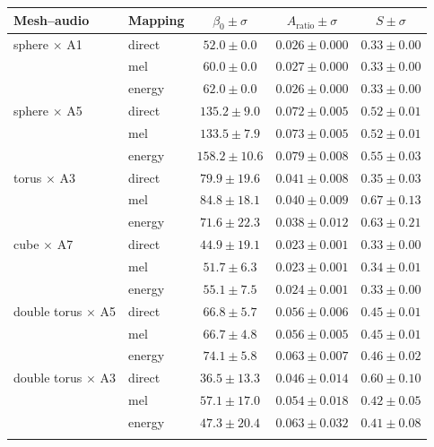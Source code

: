 \begin{tabular}{llccc}
\toprule
Mesh--audio & Mapping & $\beta_0 \pm \sigma$ & $A_{\mathrm{ratio}} \pm \sigma$ & $S \pm \sigma$ \\
\midrule
sphere $\times$ A1 & direct & $52.0 \pm 0.0$ & $0.026 \pm 0.000$ & $0.33 \pm 0.00$ \\
 & mel & $60.0 \pm 0.0$ & $0.027 \pm 0.000$ & $0.33 \pm 0.00$ \\
 & energy & $62.0 \pm 0.0$ & $0.026 \pm 0.000$ & $0.33 \pm 0.00$ \\
\addlinespace
sphere $\times$ A5 & direct & $135.2 \pm 9.0$ & $0.072 \pm 0.005$ & $0.52 \pm 0.01$ \\
 & mel & $133.5 \pm 7.9$ & $0.073 \pm 0.005$ & $0.52 \pm 0.01$ \\
 & energy & $158.2 \pm 10.6$ & $0.079 \pm 0.008$ & $0.55 \pm 0.03$ \\
\addlinespace
torus $\times$ A3 & direct & $79.9 \pm 19.6$ & $0.041 \pm 0.008$ & $0.35 \pm 0.03$ \\
 & mel & $84.8 \pm 18.1$ & $0.040 \pm 0.009$ & $0.67 \pm 0.13$ \\
 & energy & $71.6 \pm 22.3$ & $0.038 \pm 0.012$ & $0.63 \pm 0.21$ \\
\addlinespace
cube $\times$ A7 & direct & $44.9 \pm 19.1$ & $0.023 \pm 0.001$ & $0.33 \pm 0.00$ \\
 & mel & $51.7 \pm 6.3$ & $0.023 \pm 0.001$ & $0.34 \pm 0.01$ \\
 & energy & $55.1 \pm 7.5$ & $0.024 \pm 0.001$ & $0.33 \pm 0.00$ \\
\addlinespace
double torus $\times$ A5 & direct & $66.8 \pm 5.7$ & $0.056 \pm 0.006$ & $0.45 \pm 0.01$ \\
 & mel & $66.7 \pm 4.8$ & $0.056 \pm 0.005$ & $0.45 \pm 0.01$ \\
 & energy & $74.1 \pm 5.8$ & $0.063 \pm 0.007$ & $0.46 \pm 0.02$ \\
\addlinespace
double torus $\times$ A3 & direct & $36.5 \pm 13.3$ & $0.046 \pm 0.014$ & $0.60 \pm 0.10$ \\
 & mel & $57.1 \pm 17.0$ & $0.054 \pm 0.018$ & $0.42 \pm 0.05$ \\
 & energy & $47.3 \pm 20.4$ & $0.063 \pm 0.032$ & $0.41 \pm 0.08$ \\
\addlinespace
\bottomrule
\end{tabular}